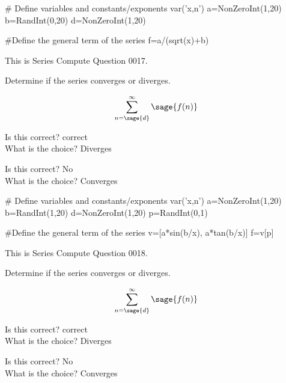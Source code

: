 \documentclass{ximera}
\renewcommand{\latexProblemContent}[1]{#1}
\renewcommand{\choice}[2][No]{\item Is this correct? #1 \\ What is the choice? #2}
\begin{document}
\begin{sagesilent}
# Define variables and constants/exponents
var('x,n')
a=NonZeroInt(1,20)
b=RandInt(0,20)
d=NonZeroInt(1,20)

#Define the general term of the series
f=a/(sqrt(x)+b)

\end{sagesilent}

\latexProblemContent{
\ifVerboseLocation This is Series Compute Question 0017. \\ \fi
\begin{problem}
Determine if the series converges or diverges.  

\[\sum_{n=\sage{d}}^\infty \sage{f(n)}\]



\begin{multipleChoice}
\choice[correct]{Diverges}
\choice{Converges}
\end{multipleChoice}

\end{problem}}%

\begin{sagesilent}
# Define variables and constants/exponents
var('x,n')
a=NonZeroInt(1,20)
b=RandInt(1,20)
d=NonZeroInt(1,20)
p=RandInt(0,1)

#Define the general term of the series
v=[a*sin(b/x), a*tan(b/x)]
f=v[p]

\end{sagesilent}

\latexProblemContent{
\ifVerboseLocation This is Series Compute Question 0018. \\ \fi
\begin{problem}
Determine if the series converges or diverges.  

\[\sum_{n=\sage{d}}^\infty \sage{f(n)}\]



\begin{multipleChoice}
\choice[correct]{Diverges}
\choice{Converges}
\end{multipleChoice}

\end{problem}}%
\end{document}
